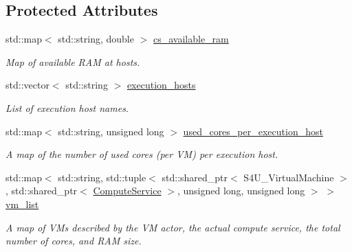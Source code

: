 \subsection*{Protected Attributes}
\begin{DoxyCompactItemize}
\item 
\mbox{\label{classwrench_1_1_cloud_service_a56d772651ad005c9de543ca24327b9c6}} 
std\+::map$<$ std\+::string, double $>$ \hyperlink{classwrench_1_1_cloud_service_a56d772651ad005c9de543ca24327b9c6}{cs\+\_\+available\+\_\+ram}
\begin{DoxyCompactList}\small\item\em Map of available R\+AM at hosts. \end{DoxyCompactList}\item 
\mbox{\label{classwrench_1_1_cloud_service_a8225cae457e491f3f3aad32653910ea0}} 
std\+::vector$<$ std\+::string $>$ \hyperlink{classwrench_1_1_cloud_service_a8225cae457e491f3f3aad32653910ea0}{execution\+\_\+hosts}
\begin{DoxyCompactList}\small\item\em List of execution host names. \end{DoxyCompactList}\item 
\mbox{\label{classwrench_1_1_cloud_service_afda7fb1800d2d418e2a586925ffd4013}} 
std\+::map$<$ std\+::string, unsigned long $>$ \hyperlink{classwrench_1_1_cloud_service_afda7fb1800d2d418e2a586925ffd4013}{used\+\_\+cores\+\_\+per\+\_\+execution\+\_\+host}
\begin{DoxyCompactList}\small\item\em A map of the number of used cores (per VM) per execution host. \end{DoxyCompactList}\item 
\mbox{\label{classwrench_1_1_cloud_service_a41782dd4332c11a992997562132f35e1}} 
std\+::map$<$ std\+::string, std\+::tuple$<$ std\+::shared\+\_\+ptr$<$ S4\+U\+\_\+\+Virtual\+Machine $>$, std\+::shared\+\_\+ptr$<$ \hyperlink{classwrench_1_1_compute_service}{Compute\+Service} $>$, unsigned long, unsigned long $>$ $>$ \hyperlink{classwrench_1_1_cloud_service_a41782dd4332c11a992997562132f35e1}{vm\+\_\+list}
\begin{DoxyCompactList}\small\item\em A map of V\+Ms described by the VM actor, the actual compute service, the total number of cores, and R\+AM size. \end{DoxyCompactList}\end{DoxyCompactItemize}
